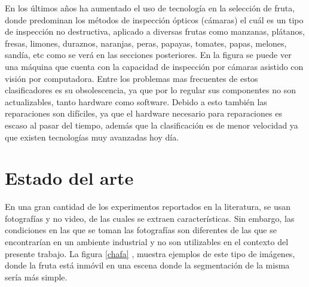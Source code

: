 \documentclass[twoside,spanish,ESP,MSc]{plantillaLabUPV}
\theoremstyle{definition}
\begin{document}

 En los últimos años ha aumentado el uso de tecnología en la selección de fruta, donde predominan los métodos de inspección ópticos (cámaras) el cuál es un tipo de inspección no destructiva, aplicado a diversas frutas como manzanas, plátanos, fresas, limones, duraznos, naranjas, peras, papayas, tomates, papas, melones, sandía, etc como se verá en las secciones posteriores. En la figura %
se puede ver una máquina que cuenta con la capacidad de inspección por cámaras asistido con visión por computadora. Entre los problemas mas frecuentes de estos clasificadores es su obsolescencia, ya que por lo regular sus componentes no son actualizables, tanto hardware como software. Debido a esto también las reparaciones son difíciles, ya que el hardware necesario para reparaciones es escaso al pasar del tiempo, además que la clasificación es de menor velocidad ya que existen tecnologías muy avanzadas hoy día.





\section{Estado del arte}

En una gran cantidad de los experimentos reportados en la literatura, se usan fotografías y no video, de las cuales se extraen características. Sin embargo, las condiciones en las que se toman las fotografías son diferentes de las que se encontrarían en un ambiente industrial y no son utilizables en el contexto del presente trabajo. La  figura \ref{chafa} \cite{chafafrut}, muestra ejemplos de este tipo de imágenes, donde la fruta está inmóvil en una escena donde la segmentación de la misma sería más simple.
\end{document}

